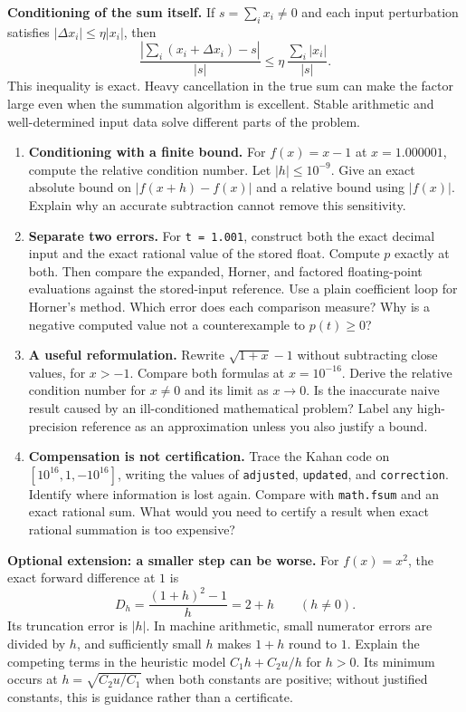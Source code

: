 \textbf{Conditioning of the sum itself.} If $s=\sum_i x_i\ne0$ and each input
perturbation satisfies $|\Delta x_i|\le\eta|x_i|$, then
\[
 \frac{|\sum_i(x_i+\Delta x_i)-s|}{|s|}
 \le \eta\,\frac{\sum_i|x_i|}{|s|}.
\]
This inequality is exact. Heavy cancellation in the true sum can make the factor
large even when the summation algorithm is excellent. Stable arithmetic and
well-determined input data solve different parts of the problem.

\newpage
{}
\begin{enumerate}
\item \textbf{Conditioning with a finite bound.} For $f(x)=x-1$ at
$x=1.000001$, compute the relative condition number. Let $|h|\le10^{-9}$.
Give an exact absolute bound on $|f(x+h)-f(x)|$ and a relative bound using
$|f(x)|$. Explain why an accurate subtraction cannot remove this sensitivity.
\item \textbf{Separate two errors.} For \texttt{t = 1.001}, construct both the
exact decimal input and the exact rational value of the stored float. Compute
$p$ exactly at both. Then compare the expanded, Horner, and factored floating-point
evaluations against the stored-input reference. Use a plain coefficient loop for
Horner's method. Which error does each comparison measure? Why is a negative
computed value not a counterexample to $p(t)\ge0$?
\item \textbf{A useful reformulation.} Rewrite
$\sqrt{1+x}-1$ without subtracting close values, for $x>-1$.
Compare both formulas at $x=10^{-16}$. Derive the relative condition number for
$x\ne0$ and its limit as $x\to0$. Is the inaccurate naive result caused by an
ill-conditioned mathematical problem? Label any high-precision reference as an
approximation unless you also justify a bound.
\item \textbf{Compensation is not certification.} Trace the Kahan code on
$[10^{16},1,-10^{16}]$, writing the values of \texttt{adjusted}, \texttt{updated},
and \texttt{correction}. Identify where information is lost again. Compare with
\texttt{math.fsum} and an exact rational sum. What would you need to certify a
result when exact rational summation is too expensive?
\end{enumerate}
\textbf{Optional extension: a smaller step can be worse.} For $f(x)=x^2$,
the exact forward difference at $1$ is
\[
 D_h=\frac{(1+h)^2-1}{h}=2+h\qquad(h\ne0).
\]
Its truncation error is $|h|$. In machine arithmetic, small numerator errors are
divided by $h$, and sufficiently small $h$ makes $1+h$ round to $1$.
Explain the competing terms in the heuristic model $C_1h+C_2u/h$ for $h>0$.
Its minimum occurs at $h=\sqrt{C_2u/C_1}$ when both constants are positive;
without justified constants, this is guidance rather than a certificate.

